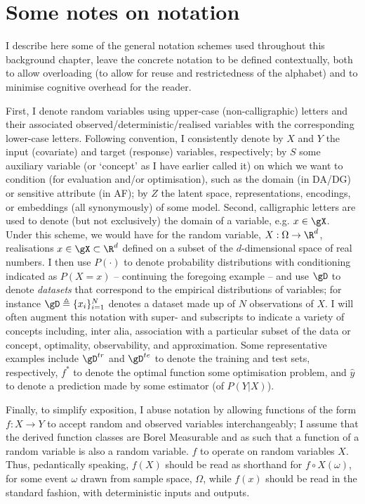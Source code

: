 \section{Some notes on notation}\label{sec:notation}
I describe here some of the general notation schemes used throughout this background chapter,
leave the concrete notation to be defined contextually, both to allow overloading (to allow for
reuse and restrictedness of the alphabet) and to minimise cognitive overhead for the reader.

%
First, I denote random variables using upper-case (non-calligraphic) letters and their associated
observed/deterministic/realised variables with the corresponding lower-case letters.
%
Following convention, I consistently denote by \(X\) and \(Y\) the input (covariate) and target
(response) variables, respectively; by \(S\) some auxiliary variable (or `concept' as I have
earlier called it) on which we want to condition (for evaluation and/or optimisation), such as the
domain (in \ac{DA}/\ac{DG}) or sensitive attribute (in \ac{AF}); by \(Z\) the latent space,
representations, encodings, or embeddings (all synonymously) of some model.
%
Second, calligraphic letters are used to denote (but not exclusively) the domain of a variable,
e.g. \(x \in \gX \).
%
Under this scheme, we would have for the random variable, \(X: \Omega \to \R^d \), realisations \(x
\in \gX \subset \R^d \) defined on a subset of the \(d\)-dimensional space of real numbers.
%
I then use \(P(\cdot)\) to denote probability distributions with conditioning indicated as
\(P(X=x)\) -- continuing the foregoing example -- and use \(\gD\) to denote \emph{datasets} that
correspond to the empirical distributions of variables; for instance \(\gD \triangleq
\{x_i\}_{i=1}^N \) denotes a dataset made up of \(N\) observations of \(X\).
%
I will often augment this notation with super- and subscripts to indicate a variety of concepts
including, inter alia, association with a particular subset of the data or concept, optimality,
observability, and approximation.
%
Some representative examples include \(\gD^{tr}\) and \(\gD^{te}\) to denote the training and test
sets, respectively, \(f^\ast\) to denote the optimal function \wrt{} some optimisation problem, and
\(\hat{y}\) to denote a prediction made by some estimator (of \(P(Y|X)\)).
%

%
Finally, to simplify exposition, I abuse notation by allowing functions of the form \(f: X \to Y
\) to accept random and observed variables interchangeably; I assume that the derived function
classes are Borel Measurable and as such that a function of a random variable is also a random
variable. \(f\) to operate on random variables \(X\).
Thus, pedantically speaking, \( f(X) \) should be read as shorthand for \( f \circ X(\omega) \),
for some event \( \omega \) drawn from sample space, \( \Omega \), while \( f(x) \) should be read
in the standard fashion, with deterministic inputs and outputs.
